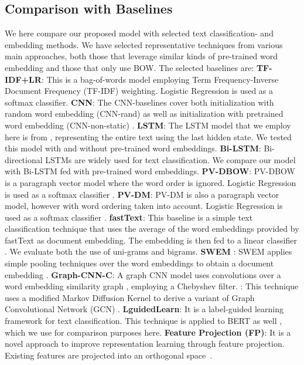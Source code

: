 \documentclass[11pt]{article}
\begin{document}
\subsection{Comparison with Baselines}
We here compare our proposed model with selected text classification- and embedding methods. We have selected representative techniques from various main approaches, both those that leverage similar kinds of pre-trained word embedding and those that only use BOW. The selected baselines are:
\textbf{TF-IDF+LR}: This is a bag-of-words model employing Term Frequency-Inverse Document Frequency (TF-IDF) weighting. Logistic Regression is used as a softmax classifier.
    \textbf{CNN}: The CNN-baselines cover both  initialization with random word embedding (CNN-rand) as well as initialization with pretrained word embedding (CNN-non-static) \cite{kim2014}.
     \textbf{LSTM}: The LSTM model that we employ here is from \cite{Liu2016}, representing the entire text using the last hidden state. We tested this model with and without pre-trained word embeddings.
     \textbf{Bi-LSTM}: Bi-directional LSTMs are widely used for text classification. We compare our model with Bi-LSTM fed with pre-trained word embeddings.
    \textbf{PV-DBOW}: PV-DBOW is a paragraph vector model where the word order is ignored. Logistic Regression is used as a softmax classifier \cite{pmlrle14}.
     \textbf{PV-DM}: PV-DM is also a paragraph vector model, however with word ordering taken into account. Logistic Regression is used as a softmax classifier \cite{pmlrle14}.
     \textbf{fastText}: This baseline is a simple text classification technique that uses the average of the word embeddings provided by fastText as document embedding. The embedding is then fed to a linear classifier \cite{joulin2017bag}. We evaluate both the use of uni-grams and bigrams.
     \textbf{SWEM} : SWEM applies simple pooling techniques over the word embeddings to obtain a document embedding \cite{shen2018baseline}.
     \textbf{Graph-CNN-C}: A graph CNN model uses convolutions over a word embedding similarity graph \cite{NIPS2016_04df4d43}, employing a Chebyshev filter.
    \textbf{}: This technique uses a modified Markov Diffusion Kernel to derive a variant of Graph Convolutional Network (GCN) \cite{zhu2021simple}.
     \textbf{LguidedLearn}: It is a label-guided learning framework for text classification. This technique is applied to BERT as well \cite{Liu2020LabelguidedLF}, which we use for comparison purposes here.
    \textbf{Feature Projection (FP)}: It is a novel approach to improve representation learning through feature projection. Existing features are projected into an orthogonal space~\cite{qin-etal-2020-feature}.
\end{document}
